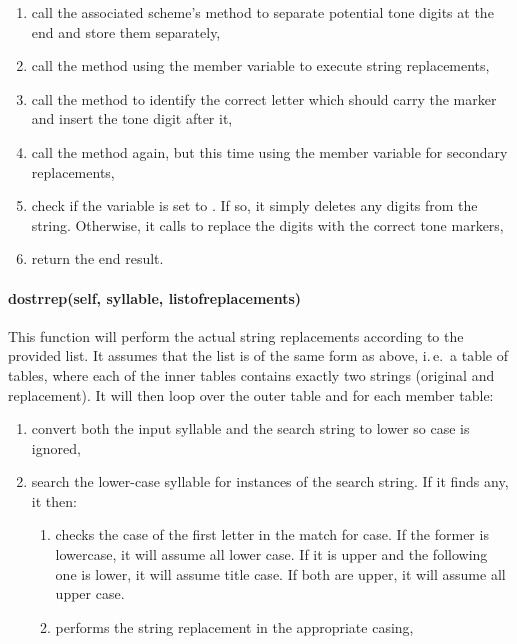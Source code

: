 \documentclass{ltxdockit}
\begin{document}
\begin{enumerate}
  \item call the associated  scheme's
     method
    to separate potential tone digits at the end and store them separately,
  \item call the  method using
    the  member variable to execute string
    replacements,
  \item call the  method
    to identify the correct letter which should carry the marker and insert the
    tone digit after it,
  \item call the  method
    again, but this time using the
     member variable for
    secondary replacements,
  \item check if the  variable is set to
    . If so, it simply deletes any digits from the string. Otherwise,
    it calls  to replace
    the digits with the correct tone markers,
  \item return the end result.
\end{enumerate}

\paragraph{do\textunderscore{}str\textunderscore{}rep(self, syllable,
list\textunderscore{}of\textunderscore{}replacements)}

This function will perform the actual string replacements according to the
provided list. It assumes that the list is of the same form as
 above, i.\,e.\ a table of tables, where each
of the inner tables contains exactly two strings (original and replacement). It
will then loop over the outer table and for each member table:

\begin{enumerate}
  \item convert both the input syllable and the search string to lower so case
    is ignored,
  \item search the lower-case syllable for instances of the search string. If it
    finds any, it then:
    \begin{enumerate}
      \item checks the case of the first letter in the match for case. If the
        former is lowercase, it will assume all lower case.  If it is upper and
        the following one is lower, it will assume title case. If both are
        upper, it will assume all upper case.
      \item performs the string replacement in the appropriate casing,
    \end{enumerate}
\end{enumerate}
\end{document}
